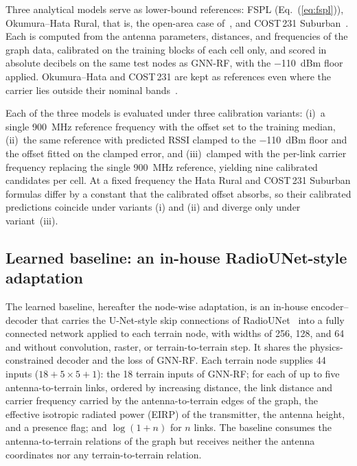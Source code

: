 \documentclass{ieeeaccess}
\begin{document}
Three analytical models serve as lower-bound references: FSPL (Eq.~(\ref{eq:fspl})), Okumura--Hata Rural, that is, the open-area case of~\cite{hata1980empirical}, and COST\,231 Suburban~\cite{cost231}. Each is computed from the antenna parameters, distances, and frequencies of the graph data, calibrated on the training blocks of each cell only, and scored in absolute decibels on the same test nodes as GNN-RF, with the $-$110~dBm floor applied. Okumura--Hata and COST\,231 are kept as references even where the carrier lies outside their nominal bands~\cite{hata1980empirical,cost231}.

Each of the three models is evaluated under three calibration variants: (i)~a single 900~MHz reference frequency with the offset set to the training median, (ii)~the same reference with predicted RSSI clamped to the $-$110~dBm floor and the offset fitted on the clamped error, and (iii)~clamped with the per-link carrier frequency replacing the single 900~MHz reference, yielding nine calibrated candidates per cell. At a fixed frequency the Hata Rural and COST\,231 Suburban formulas differ by a constant that the calibrated offset absorbs, so their calibrated predictions coincide under variants (i) and (ii) and diverge only under variant~(iii).

\subsection{Learned baseline: an in-house RadioUNet-style adaptation}
\label{sec:learned_baseline}

The learned baseline, hereafter the node-wise adaptation, is an in-house encoder--decoder that carries the U-Net-style skip connections of RadioUNet~\cite{levie2021radiounet} into a fully connected network applied to each terrain node, with widths of 256, 128, and 64 and without convolution, raster, or terrain-to-terrain step. It shares the physics-constrained decoder and the loss of GNN-RF. Each terrain node supplies 44 inputs ($18 + 5 \times 5 + 1$): the 18 terrain inputs of GNN-RF; for each of up to five antenna-to-terrain links, ordered by increasing distance, the link distance and carrier frequency carried by the antenna-to-terrain edges of the graph, the effective isotropic radiated power (EIRP) of the transmitter, the antenna height, and a presence flag; and $\log(1+n)$ for $n$ links. The baseline consumes the antenna-to-terrain relations of the graph but receives neither the antenna coordinates nor any terrain-to-terrain relation.
\end{document}
